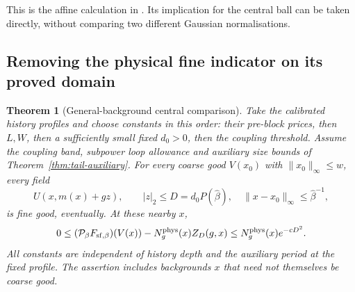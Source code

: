 \documentclass[11pt,reqno]{amsart}
\numberwithin{equation}{section}
\newtheorem{theorem}{Theorem}[section]
\theoremstyle{definition}
\theoremstyle{remark}
\begin{document}
This is the affine calculation in
\cite[Lemma~17.2 and Proposition~17.3, pp.~92--93]{Main}.
Its implication for the central ball can be taken directly,
without comparing two different Gaussian normalisations.

\subsection{Removing the physical fine indicator on its proved domain}

\begin{theorem}[General-background central comparison]
\label{thm:general-central-comparison}
Take the calibrated history profiles and choose constants in this
order: their pre-block prices, then \(L,W\), then a sufficiently
small fixed \(d_0>0\), then the coupling threshold.
Assume the coupling band, subpower loop allowance and auxiliary
size bounds of Theorem~\ref{thm:tail-auxiliary}.
For every coarse good \(V(x_0)\) with
\(\|x_0\|_\infty\le w\), every field
\[
 U(x,m(x)+gz),\qquad |z|_2\le D=d_0P(\widehat\beta),
       \quad\|x-x_0\|_\infty\le\widehat\beta^{-1},
\]
is fine good, eventually. At these nearby \(x\),
\begin{equation}
 0\le(\mathcal P_\beta F_{{\rm sf},\beta})(V(x))
              -N_g^{\mathrm{phys}}(x)Z_D(g,x)\le N_g^{\mathrm{phys}}(x)e^{-cD^2}.
 \label{eq:general-central-exact-comparison}
\end{equation}
All constants are independent of history depth and the auxiliary
period at the fixed profile. The assertion includes backgrounds
\(x\) that need not themselves be coarse good.
\end{theorem}
\end{document}

